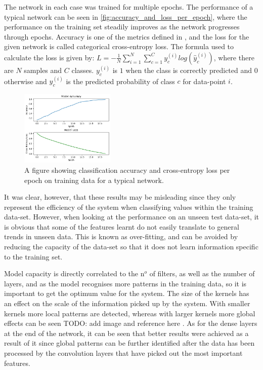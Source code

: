 The network in each case was trained for multiple epochs. The performance of a typical network can be seen in \autoref{fig:accuracy_and_loss_per_epoch}, where the performance on the training set steadily improves as the network progresses through epochs. Accuracy is one of the metrics defined in , and the loss for the given network is called categorical cross-entropy loss. The formula used to calculate the loss is given by: $ L = -\frac{1}{N}\sum^N_{i=1}\sum^C_{c=1}y_c^{(i)}log(\hat{y}_c^{(i)}) $, where there are $ N $ samples and $ C $ classes. $ y_c^{(i)} $ is $ 1 $ when the class is correctly predicted and $ 0 $ otherwise and $ \hat{y}_c^{(i)} $ is the predicted probability of class $ c $ for data-point $ i $.

\begin{figure}[htb]
    \centering
    \includegraphics[width=0.4\textwidth]{implementation/images/accuracy_and_loss_per_epoch.png}
    \caption{A figure showing classification accuracy and cross-entropy loss per epoch on training data for a typical network.}
    \label{fig:accuracy_and_loss_per_epoch}
\end{figure}

It was clear, however, that these results may be misleading since they only represent the efficiency of the system when classifying values within the training data-set. However, when looking at the performance on an unseen test data-set, it is obvious that some of the features learnt do not easily translate to general trends in unseen data. This is known as over-fitting, and can be avoided by reducing the capacity of the data-set so that it does not learn information specific to the training set.

Model capacity is directly correlated to the n$ ^o $ of filters, as well as the number of layers, and as the model recognises more patterns in the training data, so it is important to get the optimum value for the system. The size of the kernels has an effect on the scale of the information picked up by the system. With smaller kernels more local patterns are detected, whereas with larger kernels more global effects can be seen \color{red} TODO: add image and reference here \color{black}. As for the dense layers at the end of the network, it can be seen that better results were achieved as a result of it since global patterns can be further identified after the data has been processed by the convolution layers that have picked out the most important features.


